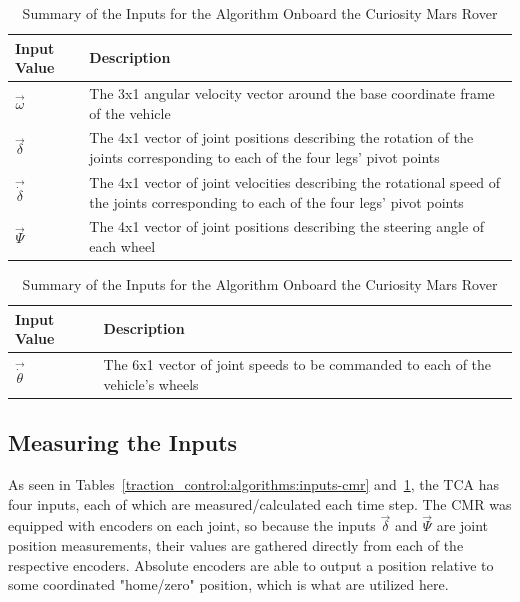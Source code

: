 \begin{table}[H]
	\centering
	\begin{tabular}{| >{\centering\arraybackslash} m{1.2in} | >{\centering\arraybackslash} m{4.5in} |}
		\hline
		\textbf{Input Value} & \textbf{Description} \\
		\hline
		$\vec{\omega}$ & The 3x1 angular velocity vector around the base coordinate frame of the vehicle \\
		\hline
		$\vec{\delta}$ & The 4x1 vector of joint positions describing the rotation of the joints corresponding to each of the four legs' pivot points \\
		\hline
		$\vec{\dot{\delta}}$ & The 4x1 vector of joint velocities describing the rotational speed of the joints corresponding to each of the four legs' pivot points \\
		\hline
		$\vec{\Psi}$ & The 4x1 vector of joint positions describing the steering angle of each wheel \\
		\hline
	\end{tabular}
	\caption{Summary of the Inputs for the Algorithm Onboard the Curiosity Mars Rover}
	\label{traction_control:algorithms:inputs-srr}
\end{table}

\begin{table}[H]
	\centering
	\begin{tabular}{| >{\centering\arraybackslash} m{1.2in} | >{\centering\arraybackslash} m{4.5in} |}
		\hline
		\textbf{Input Value} & \textbf{Description} \\
		\hline
		$\vec{\dot{\theta}}$ & The 6x1 vector of joint speeds to be commanded to each of the vehicle's wheels \\
		\hline
	\end{tabular}
	\caption{Summary of the Inputs for the Algorithm Onboard the Curiosity Mars Rover}
	\label{traction_control:algorithms:outputs-srr}
\end{table}

\subsection{Measuring the Inputs}

As seen in Tables~\ref{traction_control:algorithms:inputs-cmr} and~\ref{traction_control:algorithms:inputs-srr}, the \ac{TCA} has four inputs, each of which are measured/calculated each time step. The \ac{CMR} was equipped with encoders on each joint, so because the inputs $\vec{\delta}$ and $\vec{\Psi}$ are joint position measurements, their values are gathered directly from each of the respective encoders. Absolute encoders are able to output a position relative to some coordinated "home/zero" position, which is what are utilized here. \\

